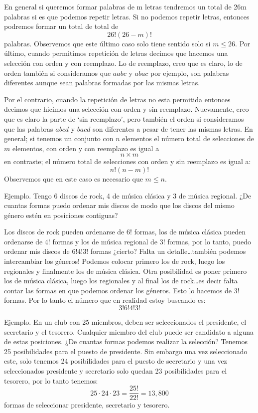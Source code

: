 \documentclass[14pt]{extreport}
\newcounter{ejemplo}[chapter]
\begin{document}
En general si queremos formar palabras de m letras tendremos un total de 26m palabras si es que podemos repetir letras. Si no podemos repetir letras, entonces podremos formar un total de total de
$$
  26! (26 - m)!
$$
palabras. Observemos que este último caso solo tiene sentido solo si $m \leq 26$. Por último, cuando permitimos repetición de letras decimos que hacemos una selección con orden y con reemplazo. Lo de reemplazo, creo que es claro, lo de orden también si consideramos que $aabc$ y $abac$ por ejemplo, son palabras diferentes aunque sean palabras formadas por las mismas letras.

Por el contrario, cuando la repetición de letras no esta permitida entonces decimos que hicimos una selección con orden y sin reemplazo. Nuevamente, creo que es claro la parte de `sin reemplazo', pero también el orden si consideramos que las palabras $abcd$ y $bacd$ son diferentes a pesar de tener las mismas letras. En general; si tenemos un conjunto con $n$ elementos el número total de selecciones de $m$ elementos, con orden y con reemplazo es igual a
$$
  n\times m
$$
en contraste; el número total de selecciones con orden y sin reemplazo es igual a:
$$
  n! (n - m)!
$$
Observemos que en este caso es necesario que $m \leq n$.

Ejemplo. Tengo 6 discos de rock, 4 de música clásica y 3 de música regional. ¿De cuantas formas puedo ordenar mis discos de modo que los discos del mismo género estén en posiciones contiguas?

Los discos de rock pueden ordenarse de $6!$ formas, los de música clásica pueden ordenarse de $4!$ formas y los de música regional de $3!$ formas, por lo tanto, puedo ordenar mis discos de $6!4!3!$ formas ¿cierto? Falta un detalle\dots también podemos intercambiar los géneros! Podemos colocar primero los de rock, luego los regionales y finalmente los de música clásica. Otra posibilidad es poner primero los de música clásica, luego los regionales y al final los de rock\dots es decir falta contar las formas en que podemos ordenar los géneros. Esto lo hacemos de $3!$ formas. Por lo tanto el número que en realidad estoy buscando es:
$$
  3!6!4!3!
$$

Ejemplo. En un club con 25 miembros, deben ser seleccionados el presidente, el secretario y el tesorero. Cualquier miembro del club puede ser candidato a alguna de estas posiciones. ¿De cuantas formas podemos realizar la selección? Tenemos 25 posibilidades para el puesto de presidente. Sin embargo una vez seleccionado este, solo tenemos 24 posibilidades para el puesto de secretario y una vez seleccionados presidente y secretario solo quedan 23 posibilidades para el tesorero, por lo tanto tenemos:
$$
  25 \cdot 24 \cdot 23 = \frac{25!}{22!} = 13,800
$$
formas de seleccionar presidente, secretario y tesorero.
\end{document}
